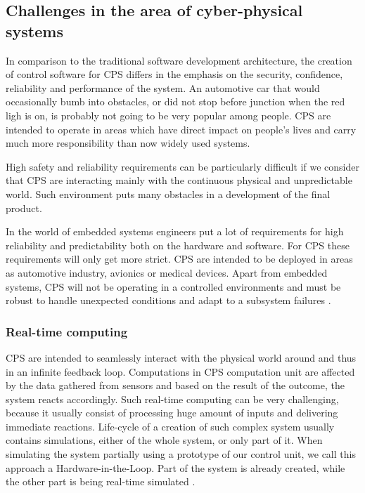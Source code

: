 \documentclass[english,technical,10pt]{FITreport}[2018/01/26]
\begin{document}
\subsection{Challenges in the area of cyber-physical systems}

In comparison to the traditional software development architecture, the creation of control software for CPS differs in the emphasis on the security, confidence, reliability and performance of the system. An automotive car that would occasionally bumb into obstacles, or did not stop before junction when the red ligh is on, is probably not going to be very popular among people. CPS are intended to operate in areas which have direct impact on people’s lives and carry much more responsibility than now widely used systems.

High safety and reliability requirements can be particularly difficult if we consider that CPS are interacting mainly with the continuous physical and unpredictable world. Such environment puts many obstacles in a development of the final product.

In the world of embedded systems engineers put a lot of requirements for high reliability and predictability both on the hardware and software. For CPS these requirements will only get more strict. CPS are intended to be deployed in areas as automotive industry, avionics or medical devices. Apart from embedded systems, CPS will not be operating in a controlled environments and must be robust to handle unexpected conditions and adapt to a subsystem failures \cite{Lee:2008}.

\subsubsection{Real-time computing}
CPS are intended to seamlessly interact with the physical world around and thus in an infinite feedback loop. Computations in CPS computation unit are affected by the data gathered from sensors and based on the result of the outcome, the system reacts accordingly. Such real-time computing can be very challenging, because it usually consist of processing huge amount of inputs and delivering immediate reactions. Life-cycle of a creation of such complex system usually contains simulations, either of the whole system, or only part of it. When simulating the system partially using a prototype of our control unit, we call this approach a Hardware-in-the-Loop. Part of the system is already created, while the other part is being real-time simulated \cite{Usenmez:2009}.
\end{document}
